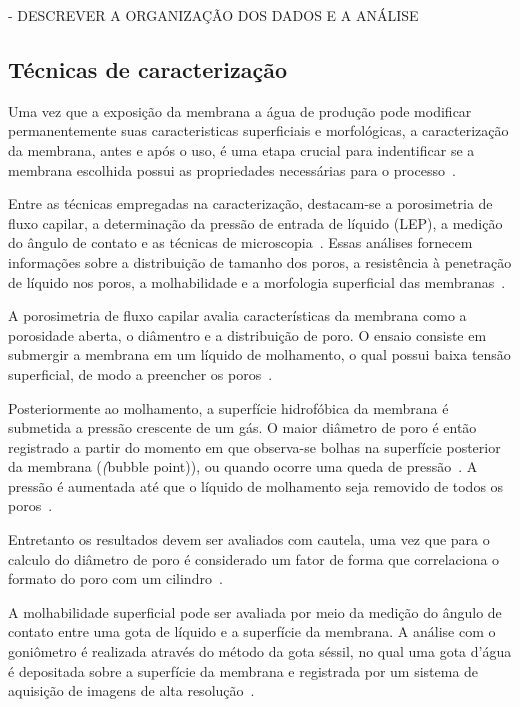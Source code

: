 - DESCREVER A ORGANIZAÇÃO DOS DADOS E A ANÁLISE 


\subsection{Técnicas de caracterização}

Uma vez que a exposição da membrana a água de produção pode modificar permanentemente suas caracteristicas superficiais e morfológicas, a caracterização da membrana, antes e após o uso, é uma etapa crucial para indentificar se a membrana escolhida possui as propriedades necessárias para o processo~\cite{Laqbaqbi2017}.

Entre as técnicas empregadas na caracterização, destacam-se a porosimetria de fluxo capilar, a determinação da pressão de entrada de líquido (LEP), a medição do ângulo de contato e as técnicas de microscopia~\cite{Jena2010Porometry,Alqaheem2020}. Essas análises fornecem informações sobre a distribuição de tamanho dos poros, a resistência à penetração de líquido nos poros, a molhabilidade e a morfologia superficial das membranas~\cite{Yao2020WettabilityMD,Laqbaqbi2017}.

A porosimetria de fluxo capilar avalia características da membrana como a porosidade aberta, o diâmentro e a distribuição de poro. O ensaio consiste em submergir a membrana em um líquido de molhamento, o qual possui baixa tensão superficial, de modo a preencher os poros~\cite{TanisKanbur2021,Jena2010Porometry}.

Posteriormente ao molhamento, a superfície hidrofóbica da membrana é submetida a pressão crescente de um gás. O maior diâmetro de poro é então registrado a partir do momento em que observa-se bolhas na superfície posterior da membrana (\textit(bubble point)), ou quando ocorre uma queda de pressão~\cite{TanisKanbur2021,Jena2010Porometry}. A pressão é aumentada até que o líquido de molhamento seja removido de todos os poros~\cite{TanisKanbur2021,Jena2010Porometry}.

Entretanto os resultados devem ser avaliados com cautela, uma vez que para o calculo do diâmetro de poro é considerado um fator de forma que correlaciona o formato do poro com um cilindro~\cite{TanisKanbur2021,Jena2010Porometry}.

A molhabilidade superficial pode ser avaliada por meio da medição do ângulo de contato entre uma gota de líquido e a superfície da membrana. A análise com o goniômetro é realizada através do método da gota séssil, no qual uma gota d'água é depositada sobre a superfície da membrana e registrada por um sistema de aquisição de imagens de alta resolução~\cite{Park2017LEP}.

